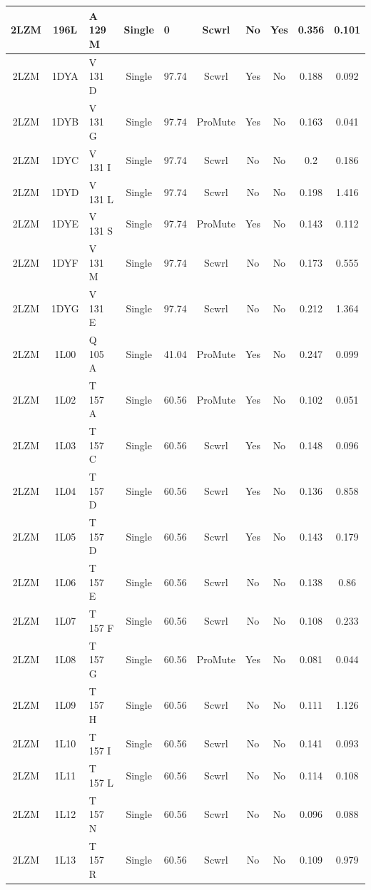 \documentclass[sigconf]{acmart}
\begin{document}
\begin{table}[]
{\begin{tabular}{|c|c|p{2.8cm}|c|p{2.8cm}|c|c|c|c|c|}
		2LZM & 196L & A 129 M & Single & 0 & Scwrl & No & Yes & 0.356 & 0.101 \\ \hline
		2LZM & 1DYA & V 131 D & Single & 97.74 & Scwrl & Yes & No & 0.188 & 0.092 \\ \hline
		2LZM & 1DYB & V 131 G & Single & 97.74 & ProMute & Yes & No & 0.163 & 0.041 \\ \hline
		2LZM & 1DYC & V 131 I & Single & 97.74 & Scwrl & No & No & 0.2 & 0.186 \\ \hline
		2LZM & 1DYD & V 131 L & Single & 97.74 & Scwrl & No & No & 0.198 & 1.416 \\ \hline
		2LZM & 1DYE & V 131 S & Single & 97.74 & ProMute & Yes & No & 0.143 & 0.112 \\ \hline
		2LZM & 1DYF & V 131 M & Single & 97.74 & Scwrl & No & No & 0.173 & 0.555 \\ \hline
		2LZM & 1DYG & V 131 E & Single & 97.74 & Scwrl & No & No & 0.212 & 1.364 \\ \hline
		2LZM & 1L00 & Q 105 A & Single & 41.04 & ProMute & Yes & No & 0.247 & 0.099 \\ \hline
		2LZM & 1L02 & T 157 A & Single & 60.56 & ProMute & Yes & No & 0.102 & 0.051 \\ \hline
		2LZM & 1L03 & T 157 C & Single & 60.56 & Scwrl & Yes & No & 0.148 & 0.096 \\ \hline
		2LZM & 1L04 & T 157 D & Single & 60.56 & Scwrl & Yes & No & 0.136 & 0.858 \\ \hline
		2LZM & 1L05 & T 157 D & Single & 60.56 & Scwrl & Yes & No & 0.143 & 0.179 \\ \hline
		2LZM & 1L06 & T 157 E & Single & 60.56 & Scwrl & No & No & 0.138 & 0.86 \\ \hline
		2LZM & 1L07 & T 157 F & Single & 60.56 & Scwrl & No & No & 0.108 & 0.233 \\ \hline
		2LZM & 1L08 & T 157 G & Single & 60.56 & ProMute & Yes & No & 0.081 & 0.044 \\ \hline
		2LZM & 1L09 & T 157 H & Single & 60.56 & Scwrl & No & No & 0.111 & 1.126 \\ \hline
		2LZM & 1L10 & T 157 I & Single & 60.56 & Scwrl & No & No & 0.141 & 0.093 \\ \hline
		2LZM & 1L11 & T 157 L & Single & 60.56 & Scwrl & No & No & 0.114 & 0.108 \\ \hline
		2LZM & 1L12 & T 157 N & Single & 60.56 & Scwrl & No & No & 0.096 & 0.088 \\ \hline
		2LZM & 1L13 & T 157 R & Single & 60.56 & Scwrl & No & No & 0.109 & 0.979 \\ \hline

\end{tabular}}
\end{table}
\end{document}
